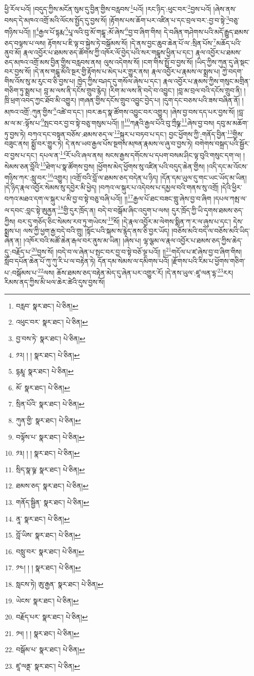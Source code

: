 ཕྱི་རོལ་པའོ། །བདུད་ཀྱིས་མངོན་སུམ་དུ་བྱིན་གྱིས་བརླབས་\footnote{བརླབ་  སྣར་ཐང་།  པེ་ཅིན། }པའོ། །རང་ཉིད་:ཕུང་བར་\footnote{འཕུང་བར་  སྣར་ཐང་།  པེ་ཅིན། }བྱས་པའོ། །ཞེས་ནས་བསད་དེ་མཁའ་འགྲོ་མའི་ལོངས་སྤྱོད་དུ་བྱས་སོ། །རྟོགས་པས་ཆོག་པར་འཛིན་པ་དང་བྲལ་བར་:བྱ་བ་སྟེ་\footnote{བྱ་བས་ཏེ་  སྣར་ཐང་།  པེ་ཅིན། }བཅུ་གཉིས་པའོ།། །།\footnote{༡༢། ། །  སྣར་ཐང་།  པེ་ཅིན། }རྒྱལ་པོ་དྷརྨ་\footnote{དྷརྨཱ་  སྣར་ཐང་།  པེ་ཅིན། }པཱ་ལའི་བུ་མོ་གངྒཱ་:མོ་ཞེས་\footnote{མོ་  སྣར་ཐང་།  པེ་ཅིན། }བྱ་བ་ཞིག་གིས། དེ་བཞིན་གཤེགས་པའི་མདོ་རྒྱུད་ཐམས་ཅད་བལྟས་པ་ལས། རྟོགས་པ་ཇི་ལྟ་བ་སྐྱེས་ཏེ་བསྒོམས་སོ། །དེ་ནས་བྱང་ཆུབ་ཆེན་པོ་ལ་:སྲིན་པོས་\footnote{སྲིན་པོའི་  སྣར་ཐང་།  པེ་ཅིན། }མཆོད་པའི་ནུབ་མོ། རྣལ་འབྱོར་པ་ཐམས་ཅད་ཚོགས་ཀྱི་འཁོར་ལོ་བྱེད་པའི་སར་གངྒཱས་ཕྱིན་པ་དང་། རྣལ་འབྱོར་པ་ཐམས་ཅད་མཁའ་འགྲོ་མས་བྱིན་གྱིས་བརླབས་ནས། ལུས་འདེགས་སོ། །ངག་གིས་སྤྲོ་བ་བྱས་སོ། །ཡིད་ཀྱིས་ཀུན་དུ་ཞེ་སྡང་བར་བྱས་སོ། །དེ་ནས་གངྒཱ་མོའི་སྔར་གྱི་རྟོགས་པ་མེད་པར་གྱུར་ནས། རྣལ་འབྱོར་པ་རྣམས་ལ་སྨྲས་པ། ཀྱེ་བདག་གིས་འོས་སུ་མ་རུང་བ་ཅི་བྱས་པ། ཁྱེད་ཀྱིས་བཤད་དུ་གསོལ་ཞེས་པ་དང་། རྣལ་འབྱོར་པ་རྣམས་ཀྱིས་གསུང་མགྲིན་གཅིག་ཏུ་སྨྲས་པ། བླ་མ་ལས་ནི་དངོས་གྲུབ་རྙེད། །རིག་མ་ལས་ནི་བདེ་བ་འབྱུང་། །བླ་མ་བྲལ་བའི་དངོས་གྲུབ་ནི། །ཁྲི་ཕྲག་འབད་ཀྱང་ཐོབ་མི་འགྱུར། །གཞན་གྱིས་དངོས་གྲུབ་འབྱུང་བྱེད་པ། །དུག་དང་བཅས་པའི་ཟས་བཞིན་ནོ། །མཁའ་འགྲོ་:ཀུན་གྱིས་\footnote{ཀུན་གྱི་  སྣར་ཐང་།  པེ་ཅིན། }འཚེ་བ་དང་། །བར་ཆད་སྣ་ཚོགས་འབྱུང་བར་འགྱུར། །ཞེས་བྱ་བས་དད་པར་བྱས་སོ། །བླ་མ་ལ་མ་:ལྟོས་པ་\footnote{བལྟོས་པ་  སྣར་ཐང་།  པེ་ཅིན། }སྤང་བར་བྱ་བ་སྟེ་བཅུ་གསུམ་པའོ།། །།\footnote{༡༣། ། །  སྣར་ཐང་།  པེ་ཅིན། }ཀརྣའི་རྒྱལ་པོའི་བུ་ཀྲྀཥྞ་\footnote{སྲིད་སྣ་ཥྞ་  སྣར་ཐང་།  པེ་ཅིན། }ཞེས་བྱ་བས། དབུ་མ་མཆོག་ཏུ་བྱས་ཏེ། བཀའ་དང་བསྟན་བཅོས་:ཐམས་ཅད་ལ་\footnote{ཐམས་ཅད་  སྣར་ཐང་།  པེ་ཅིན། }སྐུར་པ་བཏབ་པ་དང་། བྱང་ཕྱོགས་ཀྱི་:གནོད་བྱིན་\footnote{གནོད་སྦྱིན་  སྣར་ཐང་།  པེ་ཅིན། }གྱིས་བཟུང་ནས། སྨྱོ་བར་གྱུར་ཏེ། དེ་ནས་ཡབ་རྒྱལ་པོས་སྔགས་མཁན་རྣམས་ལ་ཞུ་བ་བྱས་ཏེ། བགེགས་བསྐྲད་པའི་སྦྱོར་བ་བྱས་པ་དང་། དཔལ་ན་\footnote{ནཱ་  སྣར་ཐང་།  པེ་ཅིན། }རོ་པའི་ཞལ་ནས། སངས་རྒྱས་དགོངས་པ་དཔག་བསམ་ཤིང་ལྟ་བུའི་གསུང་དག་ལ། །སེམས་ཅན་བློའི་\footnote{བློ་ཡིས་  སྣར་ཐང་།  པེ་ཅིན། }ཐེག་པ་སྣ་ཚོགས་བྱས། །ཕྱོགས་མེད་ཕྱོགས་སུ་འཛིན་པའི་བདུད་ཆེན་གྱིས། །འདི་དང་མ་འོངས་གཉིས་ཀར་:སླུ་བར་\footnote{བསླུ་བར་  སྣར་ཐང་།  པེ་ཅིན། }འགྱུར། །འགྲོ་བའི་བློ་ལ་ཐམས་ཅད་བདེན་པ་ཉིད། །དོན་དམ་ཡུལ་དུ་གང་ཡང་ཡོད་མ་ཡིན། །དེ་ཉིད་རྣལ་འབྱོར་སེམས་སུ་དབྱེར་མི་ཕྱེད། །བཀའ་ལ་སྐུར་པ་འདེབས་པ་དམྱལ་བའི་གནས་སུ་འགྲོ། །དེའི་ཕྱིར་བཀའ་མཐའ་དག་ལ་སྐུར་པ་མི་བྱ་བ་སྟེ་བཅུ་བཞི་པའོ།། །།\footnote{༡༤། ། །  སྣར་ཐང་།  པེ་ཅིན། }རྒྱལ་པོ་ཐང་བཟང་གླུ་ཞེས་བྱ་བ་ཞིག །དཔལ་ཀམྤ་ལ་ལ་དབང་:བླང་སྟེ་ཨུནྱན་\footnote{སླངས་ཏེ། ཨུ་རྒྱན་  སྣར་ཐང་།  པེ་ཅིན། }གྱི་དུར་ཁྲོད་ན། བདེ་བ་བསྒོམ་ཞིང་འདུག་པ་ལས། དུར་ཁྲོད་ཀྱི་ཡི་དྭགས་ཐམས་ཅད་ཀྱིས། བར་དུ་གཅོད་ཅིང་སེམས་རབ་ཏུ་གཡེངས་\footnote{ཡེངས་  སྣར་ཐང་།  པེ་ཅིན། }སོ། །དེ་རྣལ་འབྱོར་མ་ལེགས་སྨིན་ཀ་ར་ལ་ཞུས་པ་དང་། དེས་སྨྲས་པ། ལས་ཀྱི་ཕྱག་རྒྱ་བདེ་བའི་གྲུ། །སྟོང་པའི་སྐམ་ས་རྙེད་ནས་ཅི་བྱར་ཡོད། །བཅོས་མའི་བདེ་ལ་བཅོས་མའི་ཡིད་ཞེན་ན། །འཁོར་བའི་མཚོ་ཆེན་རྒལ་བར་ནུས་མ་ཡིན། །ཞེས་པ། ལྷ་ལྕམ་ལ་རྣལ་འབྱོར་པ་ཐམས་ཅད་ཀྱིས་ཆེད་དུ་:བརྗོད་པ་\footnote{བརྗོད་པར་  སྣར་ཐང་།  པེ་ཅིན། }བྱས་སོ། །བདེ་བ་ལ་ཞེན་པ་སྤང་བར་བྱ་བ་སྟེ་བཅོ་ལྔ་པའོ།། །།\footnote{༡༥། ། །  སྣར་ཐང་།  པེ་ཅིན། }གདོལ་པ་ཛ་ཞེས་བྱ་བ་ཞིག་གིས། སློབ་དཔོན་ཆེན་པོ་ཀུ་ཀུ་རི་པ་ལ་བརྟེན་ཏེ། དོན་དམ་སེམས་ལ་དམིགས་པའོ། །རྫོགས་པའི་རིམ་པ་ཕྱོགས་གཅིག་པ་:བསྒོམས་པ་\footnote{བསྒོམ་པ་  སྣར་ཐང་།  པེ་ཅིན། }ལས། ཆོས་ཐམས་ཅད་བརྟེན་མེད་དུ་ཞེན་པར་འགྱུར་རོ། །དེ་ནས་ཡུལ་:ཛཱ་ལན་དྷ་\footnote{ཛཱ་ལནྡ་  སྣར་ཐང་།  པེ་ཅིན། }རར། རིམས་ནད་ཀྱིས་མི་ཕལ་ཆེར་ཚེའི་དུས་བྱས་སོ། 